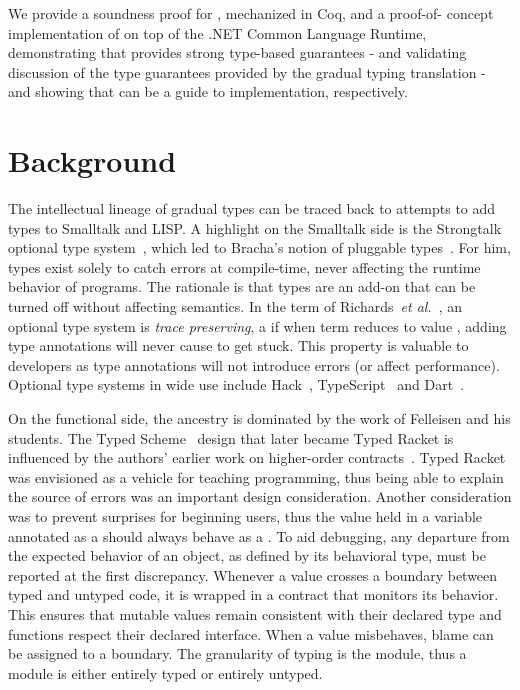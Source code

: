 \documentclass[a4paper,USenglish]{tex/lipics-v2016}
\begin{document}
We provide a soundness proof for \kafka, mechanized in Coq, and a proof-of-
concept implementation of \kafka on top of the .NET Common Language Runtime,
demonstrating that \kafka provides strong type-based guarantees - and
validating  discussion of the type guarantees provided by the gradual typing
translation - and showing that \kafka can be a guide to implementation,
respectively.

\section{Background}


\noindent The intellectual lineage of gradual types can be traced back to
attempts to add types to Smalltalk and LISP. A highlight on the Smalltalk
side is the Strongtalk optional type system~\cite{Bracha93}, which led to
Bracha's notion of pluggable types~\cite{pluggabletypes}. For him, types
exist solely to catch errors at compile-time, never affecting the runtime
behavior of programs. The rationale is that types are an add-on that can be
turned off without affecting semantics.  In the term of Richards~\emph{et
  al.}~\cite{ecoop15}, an optional type system is \emph{trace preserving}, a
if when term \e reduces to value \a, adding type annotations will never
cause \e to get stuck. This property is valuable to developers as type
annotations will not introduce errors (or affect performance).  Optional
type systems in wide use include Hack~\cite{hack13}, TypeScript~\cite{BAT14}
and Dart~\cite{dart13}.

On the functional side, the ancestry is dominated by the work of Felleisen
and his students.  The Typed Scheme~\cite{tf-popl08} design that later
became Typed Racket is influenced by the authors' earlier work on
higher-order contracts~\cite{ff-icfp02}. Typed Racket was envisioned as a
vehicle for teaching programming, thus being able to explain the source of
errors was an important design consideration. Another consideration was to
prevent surprises for beginning users, thus the value held in a variable
annotated as a \C should always behave as a \C. To aid debugging, any
departure from the expected behavior of an object, as defined by its
behavioral type, must be reported at the first discrepancy.  Whenever a value
crosses a boundary between typed and untyped code, it is wrapped in a
contract that monitors its behavior. This ensures that mutable values
remain consistent with their declared type and functions respect their
declared interface. When a value misbehaves, blame can be assigned to a
boundary. The granularity of typing is the module, thus a module is either
entirely typed or entirely untyped. 
\end{document}

